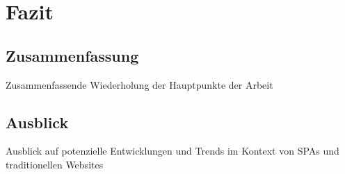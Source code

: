 \section{Fazit}
\subsection{Zusammenfassung}
Zusammenfassende Wiederholung der Hauptpunkte der Arbeit
\subsection{Ausblick}
Ausblick auf potenzielle Entwicklungen und Trends im Kontext von SPAs und traditionellen Websites